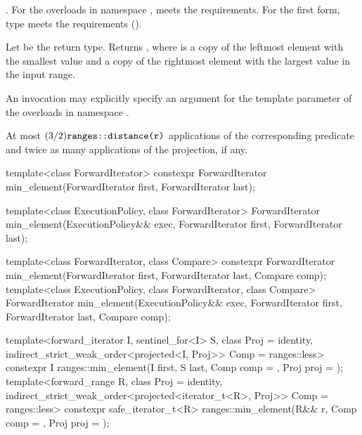 \begin{itemdescr}
\pnum
\expects
{}.
For the overloads in namespace ,
 meets the  requirements.
For the first form, type  meets the 
requirements ().

\pnum
\returns
Let  be the return type.
Returns ,
where  is a copy of the leftmost element with the smallest value and
 a copy of the rightmost element with the largest value
in the input range.

\pnum
\remarks
An invocation may explicitly specify
an argument for the template parameter 
of the overloads in namespace .

\pnum
\complexity
At most $(3/2)\texttt{ranges::distance(r)}$ applications
of the corresponding predicate
and twice as many applications of the projection, if any.
\end{itemdescr}

%
\begin{itemdecl}
template<class ForwardIterator>
  constexpr ForwardIterator min_element(ForwardIterator first, ForwardIterator last);

template<class ExecutionPolicy, class ForwardIterator>
  ForwardIterator min_element(ExecutionPolicy&& exec,
                              ForwardIterator first, ForwardIterator last);

template<class ForwardIterator, class Compare>
  constexpr ForwardIterator min_element(ForwardIterator first, ForwardIterator last,
                                        Compare comp);
template<class ExecutionPolicy, class ForwardIterator, class Compare>
  ForwardIterator min_element(ExecutionPolicy&& exec,
                              ForwardIterator first, ForwardIterator last,
                              Compare comp);

template<forward_iterator I, sentinel_for<I> S, class Proj = identity,
         indirect_strict_weak_order<projected<I, Proj>> Comp = ranges::less>
  constexpr I ranges::min_element(I first, S last, Comp comp = {}, Proj proj = {});
template<forward_range R, class Proj = identity,
         indirect_strict_weak_order<projected<iterator_t<R>, Proj>> Comp = ranges::less>
  constexpr safe_iterator_t<R>
    ranges::min_element(R&& r, Comp comp = {}, Proj proj = {});
\end{itemdecl}

